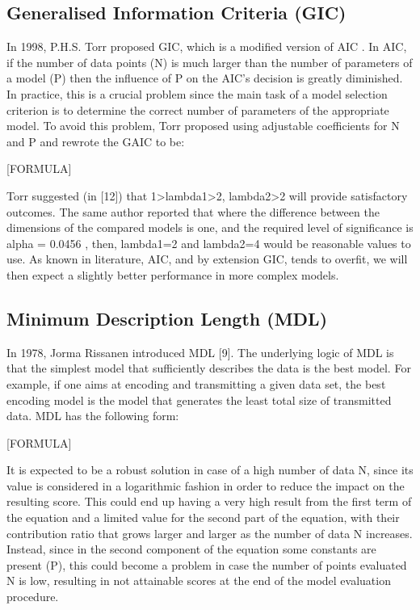 \documentclass[12pt]{article}
\begin{document}
\subsection{Generalised Information Criteria (GIC)
}
In 1998, P.H.S. Torr proposed GIC, which is a modified version of AIC . In AIC, if the number of data points (N) is much larger than the number of parameters of a model (P) then the influence of P on the AIC’s decision is greatly diminished. In practice, this is a crucial problem since the main task of a model selection criterion is to determine the correct number of parameters of the appropriate model. To avoid this problem, Torr proposed using adjustable coefficients for N and P and rewrote the GAIC to be:

[FORMULA]

Torr suggested (in [12]) that 1>lambda1>2, lambda2>2 will provide satisfactory outcomes. The same author reported that where the difference between the dimensions of the compared models is one, and the required level of significance is alpha = 0.0456 , then, lambda1=2 and lambda2=4 would be reasonable values to use.
As known in literature, AIC, and by extension GIC, tends to overfit, we will then expect a slightly better performance in more complex models.
\subsection{ Minimum Description Length (MDL)
}
In 1978, Jorma Rissanen introduced MDL [9]. The underlying logic of MDL is that the simplest model that sufficiently describes the data is the best model. For example, if one aims at encoding and transmitting a given data set, the best encoding model is the model that generates the least total size of transmitted data. MDL has the following form:   

[FORMULA]

It is expected to be a robust solution in case of a high number of data N, since its value is considered in a logarithmic fashion in order to reduce the impact on the resulting score. This could end up having a very high result from the first term of the equation and a limited value for the second part of the equation, with their contribution ratio that grows larger and larger as the number of data N increases.
Instead, since in the second component of the equation some constants are present (P), this could become a problem in case the number of points evaluated N is low, resulting in not attainable scores at the end of the model evaluation procedure.
\end{document}
